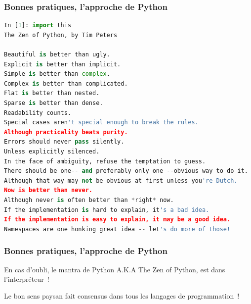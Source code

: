 \documentclass{beamer}
\begin{document}
    \begin{frame}[fragile]
        \transdissolve
        \frametitle{Bonnes pratiques, l'approche de Python}
        \begin{lstlisting}[language=python]
In [1]: import this
The Zen of Python, by Tim Peters

Beautiful is better than ugly.
Explicit is better than implicit.
Simple is better than complex.
Complex is better than complicated.
Flat is better than nested.
Sparse is better than dense.
Readability counts.
Special cases aren't special enough to break the rules.
Although practicality beats purity.
Errors should never pass silently.
Unless explicitly silenced.
In the face of ambiguity, refuse the temptation to guess.
There should be one-- and preferably only one --obvious way to do it.
Although that way may not be obvious at first unless you're Dutch.
Now is better than never.
Although never is often better than *right* now.
If the implementation is hard to explain, it's a bad idea.
If the implementation is easy to explain, it may be a good idea.
Namespaces are one honking great idea -- let's do more of those!
        \end{lstlisting}
    \end{frame}

    \begin{frame}[fragile]
        \transdissolve
        \frametitle{Bonnes pratiques, l'approche de Python}
        En cas d'oubli, le mantra de Python A.K.A The Zen of Python, est dans l'interpréteur~!

        \bigbreak

        Le bon sens paysan fait consensus dans tous les langages de programmation~!

    \end{frame}
\end{document}
